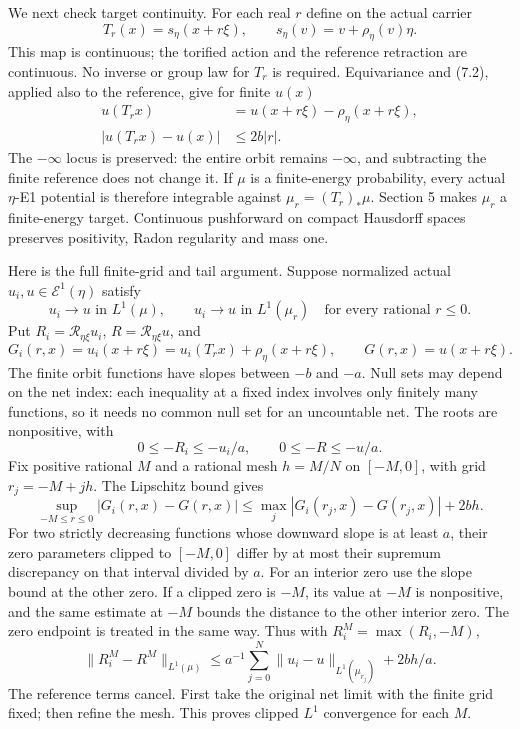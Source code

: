 \documentclass[
  10pt,
]{article}
\begin{document}
We next check target continuity. For each real \(r\) define on the
actual carrier \[
 T_r(x)=s_\eta(x+r\xi),\qquad
       s_\eta(v)=v+\rho_\eta(v)\eta.                            \tag{7.5}
\] This map is continuous; the torified action and the reference
retraction are continuous. No inverse or group law for \(T_r\) is
required. Equivariance and (7.2), applied also to the reference, give
for finite \(u(x)\) \[
 \begin{split}
 u(T_rx)&=u(x+r\xi)-\rho_\eta(x+r\xi),\\
                         |u(T_rx)-u(x)|&\leq2b|r|.
 \end{split}                                                   \tag{7.6}
\] The \(-\infty\) locus is preserved: the entire orbit remains
\(-\infty\), and subtracting the finite reference does not change it. If
\(\mu\) is a finite-energy probability, every actual \(\eta\)-E1
potential is therefore integrable against \(\mu_r=(T_r)_*\mu\). Section
5 makes \(\mu_r\) a finite-energy target. Continuous pushforward on
compact Hausdorff spaces preserves positivity, Radon regularity and mass
one.

Here is the full finite-grid and tail argument. Suppose normalized
actual \(u_i,u\in\mathcal E^1(\eta)\) satisfy \[
 u_i\to u\text{ in }L^1(\mu),\qquad
 u_i\to u\text{ in }L^1(\mu_r)\quad\text{for every rational }r\leq0.
                                                               \tag{7.7}
\] Put \(R_i=\mathcal R_{\eta\xi}u_i\), \(R=\mathcal R_{\eta\xi}u\), and
\[
 G_i(r,x)=u_i(x+r\xi)=u_i(T_rx)+\rho_\eta(x+r\xi),\qquad
 G(r,x)=u(x+r\xi).
\] The finite orbit functions have slopes between \(-b\) and \(-a\).
Null sets may depend on the net index: each inequality at a fixed index
involves only finitely many functions, so it needs no common null set
for an uncountable net. The roots are nonpositive, with \[
                    0\leq-R_i\leq-u_i/a,\qquad0\leq-R\leq-u/a. \tag{7.8}
\] Fix positive rational \(M\) and a rational mesh \(h=M/N\) on
\([-M,0]\), with grid \(r_j=-M+jh\). The Lipschitz bound gives \[
 \sup_{-M\leq r\leq0}|G_i(r,x)-G(r,x)|
             \leq\max_j|G_i(r_j,x)-G(r_j,x)|+2bh.
\] For two strictly decreasing functions whose downward slope is at
least \(a\), their zero parameters clipped to \([-M,0]\) differ by at
most their supremum discrepancy on that interval divided by \(a\). For
an interior zero use the slope bound at the other zero. If a clipped
zero is \(-M\), its value at \(-M\) is nonpositive, and the same
estimate at \(-M\) bounds the distance to the other interior zero. The
zero endpoint is treated in the same way. Thus with
\(R_i^M=\max(R_i,-M)\), \[
 \|R_i^M-R^M\|_{L^1(\mu)}
 \leq a^{-1}\sum_{j=0}^N\|u_i-u\|_{L^1(\mu_{r_j})}+2bh/a.       \tag{7.9}
\] The reference terms cancel. First take the original net limit with
the finite grid fixed; then refine the mesh. This proves clipped \(L^1\)
convergence for each \(M\).
\end{document}
